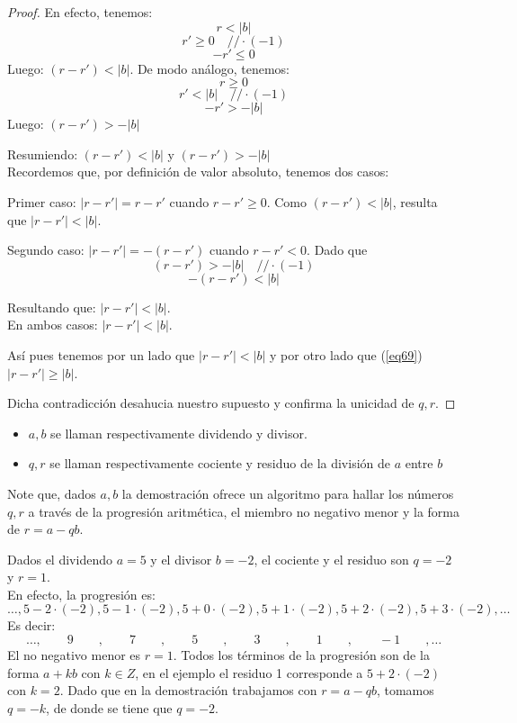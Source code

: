 \begin{proof}
En efecto, tenemos: 
\[r < |b| \]  
\[r' \geq 0 \quad // \cdot(-1) \]
\[-r' \leq 0 \]
Luego:
$(r-r') < |b|$.
De modo análogo, tenemos: 
\[r \geq 0 \]
\[r' < |b| \quad // \cdot(-1)\]
\[ -r' > -|b| \]
Luego:
$(r-r') > -|b|$

Resumiendo: $(r-r') < |b|$ y $(r-r') > -|b|$\\
Recordemos que, por definición de valor absoluto, tenemos dos casos: 

Primer caso: $|r-r'| = r-r'$ cuando $r-r' \geq 0$. 
Como $(r-r') < |b|$, resulta que $|r-r'| < |b|$. 

Segundo caso: $|r-r'| = -(r-r')$ cuando $r-r' < 0$. Dado que 
\[(r-r') > -|b| \quad // \cdot(-1)\]
\[-(r-r') < |b| \]

Resultando que: $|r-r'| < |b|$. \\
En ambos casos: $|r-r'| < |b|$.

Así pues tenemos por un lado que $|r-r'| < |b|$  y por otro lado que (\ref{eq69}) $|r - r'| \geq |b|$. 

Dicha contradicción desahucia nuestro supuesto y confirma la unicidad de $q,r$. 
\end{proof}

\begin{itemize}
    \item $a,b$ se llaman respectivamente dividendo y divisor.
    \item $q,r$ se llaman respectivamente cociente y residuo de la división de $a$ entre $b$
\end{itemize}

Note que, dados $a,b$ la demostración ofrece un algoritmo para hallar los números $q,r$ a través de la progresión aritmética, el miembro no negativo menor y la forma de $r = a-qb$.

\begin{ejemplo}
Dados el dividendo $a = 5$ y el divisor $b = -2$, el cociente y el residuo son $q = -2$ y $r = 1$. \\
En efecto, la progresión es: \[
\ldots, 5-2\cdot (-2), 5-1\cdot (-2), 5+0\cdot (-2), 5+1\cdot (-2), 5+2\cdot (-2), 5+3\cdot (-2), \ldots \]
Es decir: \[
 \ldots, \qquad 9 \qquad, \qquad 7 \quad \quad, \qquad 5 \qquad, \qquad 3 \qquad, \qquad 1 \qquad, \qquad -1 \qquad,\ldots \]
El no negativo menor es $r = 1$. 
Todos los términos de la progresión son de la forma $a+kb$ con $k \in Z$, en el ejemplo el residuo 1 corresponde a $5+2\cdot (-2)$ con $k =  2$. Dado que en la demostración trabajamos con $r = a-qb$, tomamos $q = -k$, de donde se tiene que $q = -2$.
\end{ejemplo}

